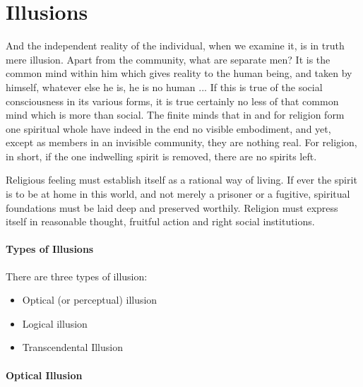 \section{Illusions}

\begin{quotex}
And the independent reality of the individual, when we examine it, is in truth mere illusion. Apart from the community, what are separate men? It is the common mind within him which gives reality to the human being, and taken by himself, whatever else he is, he is no human ... If this is true of the social consciousness in its various forms, it is true certainly no less of that common mind which is more than social. The finite minds that in and for religion form one spiritual whole have indeed in the end no visible embodiment, and yet, except as members in an invisible community, they are nothing real. For religion, in short, if the one indwelling spirit is removed, there are no spirits left.
\end{quotex}


\begin{quotex}
Religious feeling must establish itself as a rational way of living. If ever the spirit is to be at home in this world, and not merely a prisoner or a fugitive, spiritual foundations must be laid deep and preserved worthily. Religion must express itself in reasonable thought, fruitful action and right social institutions.
\end{quotex}


\paragraph{Types of Illusions}


There are three types of illusion:

\begin{itemize}
\item Optical (or perceptual) illusion

\item Logical illusion

\item Transcendental Illusion
\end{itemize}


\paragraph{Optical Illusion}


